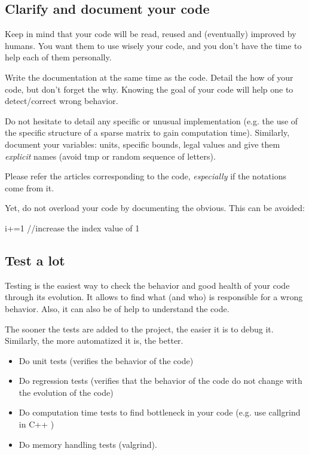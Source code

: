 
\subsection{Clarify and document your code}
Keep in mind that your code will be read, reused and (eventually) improved by humans.
You want them to use wisely your code, and you don't have the time to help each of them personally.

Write the documentation at the same time as the code. 
Detail the how of your code, but don't forget the why. 
Knowing the goal of your code will help one to detect/correct wrong behavior.

Do not hesitate to detail any specific or unusual implementation
(e.g. the use of the specific structure of a sparse matrix to gain computation time).
Similarly, document your variables: units, specific bounds, legal values and give them \textit{explicit} names (avoid tmp or random sequence of letters).	

Please refer the articles corresponding to the code, \textit{especially} if the notations come from it.

Yet, do not overload your code by documenting the obvious. This can be avoided:\\
\begin{tt} i+=1 //increase the index value of 1\end{tt}

\subsection{Test a lot}
Testing is the easiest way to check the behavior and good health of your code through its evolution.
It allows to find what (and who) is responsible for a wrong behavior.
Also, it can also be of help to understand the code.

The sooner the tests are added to the project, the easier it is to debug it.
Similarly, the more automatized it is, the better.
\begin{itemize}[noitemsep,topsep=0pt,parsep=0pt,partopsep=0pt]
\item Do unit tests (verifies the behavior of the code)
\item Do regression tests (verifies that the behavior of the code do not change with the evolution of the code)
\item Do computation time tests to find bottleneck in your code (e.g. use callgrind in C++ )
\item Do memory handling tests (valgrind).
\end{itemize}

